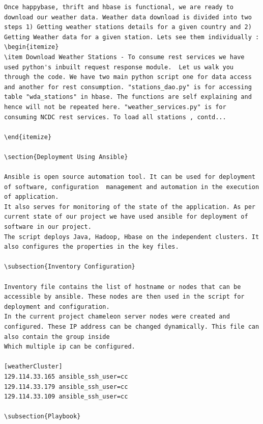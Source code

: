 \documentclass[9pt,twocolumn,twoside]{../../styles/osajnl}
\begin{document}
\begin{verbatim}
Once happybase, thrift and hbase is functional, we are ready to download our weather data. Weather data download is divided into two steps 1) Getting weather stations details for a given country and 2) Getting Weather data for a given station. Lets see them individually :
\begin{itemize}
\item Download Weather Stations - To consume rest services we have used python's inbuilt request response module.  Let us walk you through the code. We have two main python script one for data access and another for rest consumption. "stations_dao.py" is for accessing table "wda_stations" in hbase. The functions are self explaining and hence will not be repeated here. "weather_services.py" is for consuming NCDC rest services. To load all stations , contd...

\end{itemize}

\section{Deployment Using Ansible}

Ansible is open source automation tool. It can be used for deployment of software, configuration  management and automation in the execution of application. 
It also serves for monitoring of the state of the application. As per current state of our project we have used ansible for deployment of software in our project. 
The script deploys Java, Hadoop, Hbase on the independent clusters. It also configures the properties in the key files. 

\subsection{Inventory Configuration}

Inventory file contains the list of hostname or nodes that can be accessible by ansible. These nodes are then used in the script for deployment and configuration. 
In the current project chameleon server nodes were created and configured. These IP address can be changed dynamically. This file can also contain the group inside 
Which multiple ip can be configured.

[weatherCluster]
129.114.33.165 ansible_ssh_user=cc
129.114.33.179 ansible_ssh_user=cc
129.114.33.109 ansible_ssh_user=cc

\subsection{Playbook}


\end{verbatim}
\end{document}
